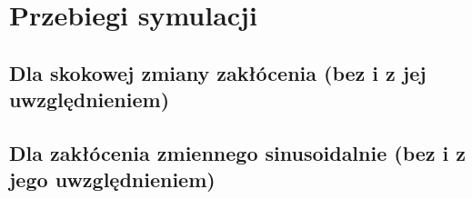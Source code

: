 \chapter{Przebiegi symulacji}

\section{Dla skokowej zmiany zakłócenia (bez i z jej uwzględnieniem)}


\section{Dla zakłócenia zmiennego sinusoidalnie (bez i z jego uwzględnieniem)}
